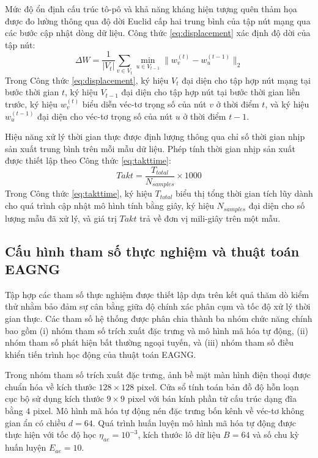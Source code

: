 Mức độ ổn định cấu trúc tô-pô và khả năng kháng hiện tượng quên thảm họa được đo lường thông qua độ dời Euclid cấp hai trung bình của tập nút mạng qua các bước cập nhật dòng dữ liệu. Công thức \ref{eq:displacement} xác định độ dời của tập nút:
\begin{equation}
\Delta W = \frac{1}{|V_t|} \sum_{v \in V_t} \min_{u \in V_{t-1}} \|w_v^{(t)} - w_u^{(t-1)}\|_2
\label{eq:displacement}
\end{equation}
Trong Công thức \ref{eq:displacement}, ký hiệu $V_t$ đại diện cho tập hợp nút mạng tại bước thời gian $t$, ký hiệu $V_{t-1}$ đại diện cho tập hợp nút tại bước thời gian liền trước, ký hiệu $w_v^{(t)}$ biểu diễn véc-tơ trọng số của nút $v$ ở thời điểm $t$, và ký hiệu $w_u^{(t-1)}$ đại diện cho véc-tơ trọng số của nút $u$ ở thời điểm $t-1$.

Hiệu năng xử lý thời gian thực được định lượng thông qua chỉ số thời gian nhịp sản xuất trung bình trên mỗi mẫu dữ liệu. Phép tính thời gian nhịp sản xuất được thiết lập theo Công thức \ref{eq:takttime}:
\begin{equation}
Takt = \frac{T_{total}}{N_{samples}} \times 1000
\label{eq:takttime}
\end{equation}
Trong Công thức \ref{eq:takttime}, ký hiệu $T_{total}$ biểu thị tổng thời gian tích lũy dành cho quá trình cập nhật mô hình tính bằng giây, ký hiệu $N_{samples}$ đại diện cho số lượng mẫu đã xử lý, và giá trị $Takt$ trả về đơn vị mili-giây trên một mẫu.

\subsection{Cấu hình tham số thực nghiệm và thuật toán EAGNG}
\label{subsec:cau_hinh_tham_so}

Tập hợp các tham số thực nghiệm được thiết lập dựa trên kết quả thăm dò kiểm thử nhằm bảo đảm sự cân bằng giữa độ chính xác phân cụm và tốc độ xử lý thời gian thực. Các tham số hệ thống được phân chia thành ba nhóm chức năng chính bao gồm (i) nhóm tham số trích xuất đặc trưng và mô hình mã hóa tự động, (ii) nhóm tham số phát hiện bất thường ngoại tuyến, và (iii) nhóm tham số điều khiển tiến trình học động của thuật toán EAGNG.

Trong nhóm tham số trích xuất đặc trưng, ảnh bề mặt màn hình điện thoại được chuẩn hóa về kích thước $128 \times 128$ pixel. Cửa sổ tính toán bản đồ độ hỗn loạn cục bộ sử dụng kích thước $9 \times 9$ pixel với bán kính phần tử cấu trúc dạng đĩa bằng $4$ pixel. Mô hình mã hóa tự động nén đặc trưng bốn kênh về véc-tơ không gian ẩn có chiều $d = 64$. Quá trình huấn luyện mô hình mã hóa tự động được thực hiện với tốc độ học $\eta_{ae} = 10^{-3}$, kích thước lô dữ liệu $B = 64$ và số chu kỳ huấn luyện $E_{ae} = 10$.

